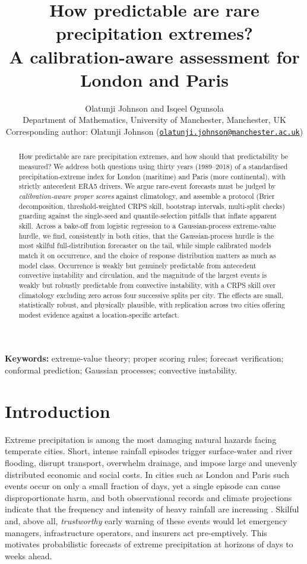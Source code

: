\documentclass[11pt,a4paper]{article}
\title{\bfseries How predictable are rare precipitation extremes?\\
A calibration-aware assessment for London and Paris}
\author{Olatunji Johnson and Isqeel Ogunsola\\[0.3em]
\small Department of Mathematics, University of Manchester, Manchester, UK\\[0.2em]
\small Corresponding author: Olatunji Johnson
(\href{mailto:olatunji.johnson@manchester.ac.uk}{\texttt{olatunji.johnson@manchester.ac.uk}})}
\date{}
\begin{document}
\maketitle

\begin{abstract}
\noindent
How predictable are rare precipitation extremes, and how should that predictability be measured? We address both questions using thirty years (1989--2018) of a standardised precipitation-extreme index for London (maritime) and Paris (more continental), with strictly antecedent ERA5 drivers. We argue rare-event forecasts must be judged by \emph{calibration-aware proper scores} against climatology, and assemble a protocol (Brier decomposition, threshold-weighted CRPS skill, bootstrap intervals, multi-split checks) guarding against the single-seed and quantile-selection pitfalls that inflate apparent skill. Across a bake-off from logistic regression to a Gaussian-process extreme-value hurdle, we find, consistently in both cities, that the Gaussian-process hurdle is the most skilful full-distribution forecaster on the tail, while simple calibrated models match it on occurrence, and the choice of response distribution matters as much as model class. Occurrence is weakly but genuinely predictable from antecedent convective instability and circulation, and the magnitude of the largest events is weakly but robustly predictable from convective instability, with a CRPS skill over climatology excluding zero across four successive splits per city. The effects are small, statistically robust, and physically plausible, with replication across two cities offering modest evidence against a location-specific artefact.\end{abstract}

\noindent\textbf{Keywords:} extreme-value theory; proper scoring rules; forecast
verification; conformal prediction; Gaussian processes; convective instability.

\section{Introduction}\label{sec:intro}

Extreme precipitation is among the most damaging natural hazards facing
temperate cities. Short, intense rainfall episodes trigger surface-water and
river flooding, disrupt transport, overwhelm drainage, and impose large and
unevenly distributed economic and social costs. In cities such as London and
Paris such events occur on only a small fraction of days, yet a single episode can
cause disproportionate
harm, and both observational records and climate projections indicate that the
frequency and intensity of heavy rainfall are increasing \citep{ipcc2021}.
Skilful and, above
all, \emph{trustworthy} early warning of these events would let emergency
managers, infrastructure operators, and insurers act pre-emptively. This
motivates probabilistic forecasts of extreme precipitation at horizons of days
to weeks ahead.
\end{document}
